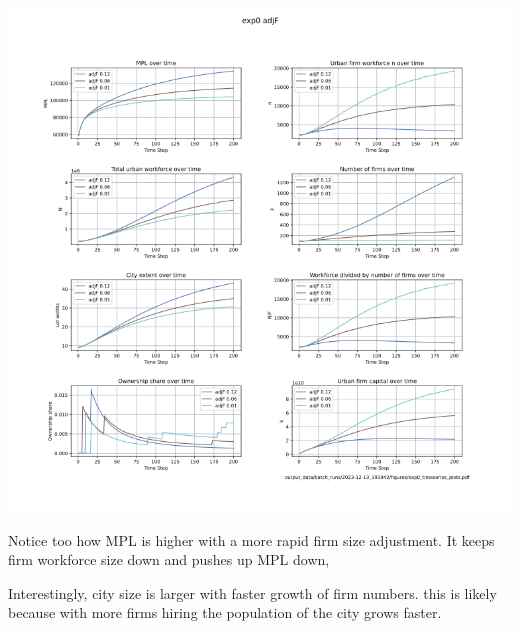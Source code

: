 \documentclass{article}
\begin{document}
\includegraphics[scale=.55]{fig/Analysis/AdjF.png}

Notice too how MPL  is higher with a more rapid firm size adjustment. It keeps  firm workforce size down and pushes up MPL down, 

  Interestingly, city size is larger with faster growth of firm numbers. this is likely because with more firms hiring the population of the city grows faster.

\newpage

\end{document}
